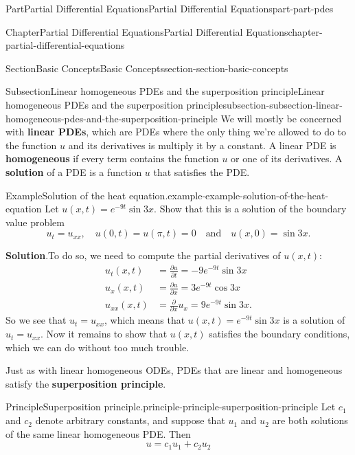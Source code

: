 \documentclass[twoside,10pt,]{book}
\newcommand{\blocktitlefont}{\relax}
\newcommand{\terminology}[1]{\textbf{#1}}
\numberwithin{equation}{part}
\newcommand{\amp}{&}
\begin{document}
\begin{partptx}{Part}{Partial Differential Equations}{}{Partial Differential Equations}{}{}{part-part-pdes}
\begin{chapterptx}{Chapter}{Partial Differential Equations}{}{Partial Differential Equations}{}{}{chapter-partial-differential-equations}
\begin{sectionptx}{Section}{Basic Concepts}{}{Basic Concepts}{}{}{section-section-basic-concepts}
\begin{subsectionptx}{Subsection}{Linear homogeneous PDEs and the superposition principle}{}{Linear homogeneous PDEs and the superposition principle}{}{}{subsection-subsection-linear-homogeneous-pdes-and-the-superposition-principle}
We will mostly be concerned with \terminology{linear PDEs}, which are PDEs where the only thing we're allowed to do to the function \(u\) and its derivatives is multiply it by a constant. A linear PDE is \terminology{homogeneous} if every term contains the function \(u\) or one of its derivatives. A \terminology{solution} of a PDE is a function \(u\) that satisfies the PDE.%
\begin{example}{Example}{Solution of the heat equation.}{example-example-solution-of-the-heat-equation}%
Let \(u(x,t) = e^{-9t}\sin3x\). Show that this is a solution of the boundary value problem%
\begin{equation*}
u_{t} = u_{xx},\quad u(0,t) = u(\pi,t) = 0\quad\text{and}\quad u(x,0) = \sin3x.
\end{equation*}
%
\par\smallskip%
\noindent\textbf{\blocktitlefont Solution}.\hypertarget{solution-example-solution-of-the-heat-equation-c}{}\quad{}To do so, we need to compute the partial derivatives of \(u(x,t):\)%
%
\begin{align*}
u_{t}(x,t) \amp = \frac{\partial u}{\partial t} = -9e^{-9t}\sin3x \\
u_{x}(x,t) \amp = \frac{\partial u}{\partial x} = 3e^{-9t}\cos3x \\
u_{xx}(x,t) \amp = \frac{\partial}{\partial x}u_{x} = 9e^{-9t}\sin3x \text{.}
\end{align*}
So we see that \(u_{t} = u_{xx}\), which means that \(u(x,t) = e^{-9t}\sin3x\) is a solution of \(u_{t} = u_{xx}\). Now it remains to show that \(u(x,t)\) satisfies the boundary conditions, which we can do without too much trouble.%
\end{example}
Just as with linear homogeneous ODEs, PDEs that are linear and homogeneous satisfy the \terminology{superposition principle}.%
\begin{principle}{Principle}{Superposition principle.}{}{principle-principle-superposition-principle}%
%
Let \(c_{1}\) and \(c_{2}\) denote arbitrary constants, and suppose that \(u_{1}\) and \(u_{2}\) are both solutions of the same linear homogeneous PDE. Then%
\begin{equation*}
u = c_{1}u_{1}+c_{2}u_{2}
\end{equation*}

\end{principle}
\end{subsectionptx}
\end{sectionptx}
\end{chapterptx}
\end{partptx}
\end{document}
